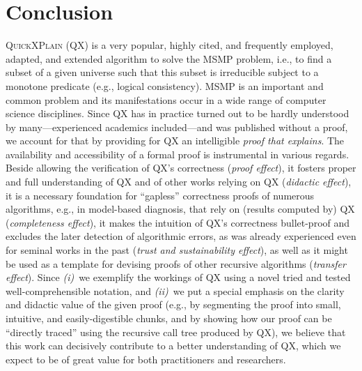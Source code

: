 \documentclass[]{elsarticle}
\begin{document}
	\section{Conclusion}
	\label{sec:conclusion}
	\textsc{QuickXPlain} (QX) is a very popular, highly cited, and frequently employed, adapted, and extended algorithm to solve the MSMP problem, i.e., to find a subset of a given universe such that this subset is irreducible subject to a monotone predicate (e.g., logical consistency). MSMP is an important and common problem and its manifestations occur in a wide range of computer science disciplines. Since QX has in practice turned out to be hardly understood by many---experienced academics included---and was published without a proof, 
	we account for that by providing for QX an intelligible
	\emph{proof that explains}. The availability and accessibility of a formal proof is instrumental in various regards. Beside allowing the verification of QX's correctness (\emph{proof effect}), it fosters proper and full understanding of QX and of other works relying on QX (\emph{didactic effect}), it is a necessary foundation for ``gapless'' correctness proofs of numerous algorithms, e.g., in model-based diagnosis, that rely on (results computed by) QX (\emph{completeness effect}), it makes the intuition of QX's correctness bullet-proof and excludes the later detection of algorithmic errors, as was already experienced even for seminal works in the past (\emph{trust and sustainability effect}), as well as it might be used as a template for devising proofs of other recursive algorithms (\emph{transfer effect}). 
	Since \emph{(i)}~we exemplify the workings of QX using a novel 
	tried and tested
	well-comprehensible notation, and 
	\emph{(ii)}~we put a special emphasis on the clarity and didactic value of the given proof (e.g., by segmenting the proof into small, intuitive, and easily-digestible chunks, and by showing how our proof can be ``directly traced'' using the recursive call tree produced by QX), we believe that this work can decisively contribute to a better understanding of QX, which we expect to be of great value for both practitioners and researchers.
	
\end{document}
